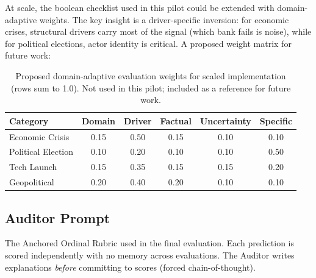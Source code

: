\documentclass[11pt,a4paper]{article}
\begin{document}
At scale, the boolean checklist used in this pilot could be extended with domain-adaptive weights. The key insight is a driver-specific inversion: for economic crises, structural drivers carry most of the signal (which bank fails is noise), while for political elections, actor identity is critical. A proposed weight matrix for future work:

\begin{table}[h]
\centering
\small
\begin{tabular}{lccccc}
\toprule
\textbf{Category} & \textbf{Domain} & \textbf{Driver} & \textbf{Factual} & \textbf{Uncertainty} & \textbf{Specific} \\
\midrule
Economic Crisis & 0.15 & 0.50 & 0.15 & 0.10 & 0.10 \\
Political Election & 0.10 & 0.20 & 0.10 & 0.10 & 0.50 \\
Tech Launch & 0.15 & 0.35 & 0.15 & 0.15 & 0.20 \\
Geopolitical & 0.20 & 0.40 & 0.20 & 0.10 & 0.10 \\
\bottomrule
\end{tabular}
\caption{Proposed domain-adaptive evaluation weights for scaled implementation (rows sum to 1.0). Not used in this pilot; included as a reference for future work.}
\label{tab:eval_weights_full}
\end{table}

\subsection{Auditor Prompt}

The Anchored Ordinal Rubric used in the final evaluation. Each prediction is scored independently with no memory across evaluations. The Auditor writes explanations \textit{before} committing to scores (forced chain-of-thought).
\end{document}
